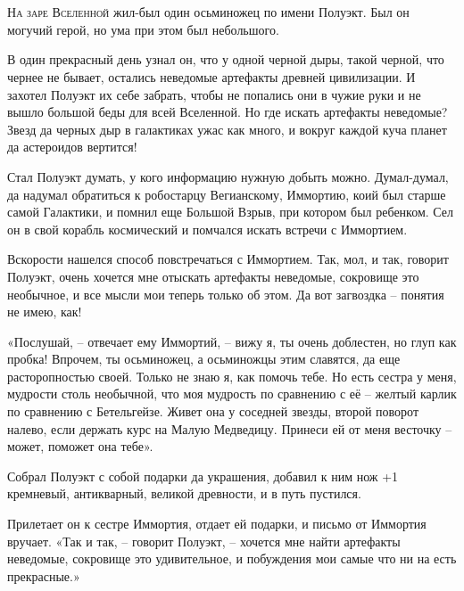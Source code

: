 \documentclass[ebook,oneside,final,openright]{memoir}
\begin{document}
\chapter{}
 \lettrine{Н}{а заре Вселенной} жил-был один осьминожец по имени Полуэкт. Был он могучий герой, но ума при этом был небольшого.\par
\par
В один прекрасный день узнал он, что у одной черной дыры, такой черной, что чернее не бывает, остались неведомые артефакты древней цивилизации. И захотел Полуэкт их себе забрать, чтобы не попались они в чужие руки и не вышло большой беды для всей Вселенной. Но где искать артефакты неведомые? Звезд да черных дыр в галактиках ужас как много, и вокруг каждой куча планет да астероидов вертится!\par
\par
Стал Полуэкт думать, у кого информацию нужную добыть можно. Думал-думал, да надумал обратиться к робостарцу Вегианскому, Иммортию, коий был старше самой Галактики, и помнил еще Большой Взрыв, при котором был ребенком. Сел он в свой корабль космический и помчался искать встречи с Иммортием.\par
\par
Вскорости нашелся способ повстречаться с Иммортием. Так, мол, и так, говорит Полуэкт, очень хочется мне отыскать артефакты неведомые, сокровище это необычное, и все мысли мои теперь только об этом. Да вот загвоздка – понятия не имею, как!\par
\par
«Послушай, – отвечает ему Иммортий, – вижу я, ты очень доблестен, но глуп как пробка! Впрочем, ты осьминожец, а осьминожцы этим славятся, да еще расторопностью своей. Только не знаю я, как помочь тебе. Но есть сестра у меня, мудрости столь необычной, что моя мудрость по сравнению с её – желтый карлик по сравнению с Бетельгейзе. Живет она у соседней звезды, второй поворот налево, если держать курс на Малую Медведицу. Принеси ей от меня весточку – может, поможет она тебе».\par
\par
Собрал Полуэкт с собой подарки да украшения, добавил к ним нож +1 кремневый, антикварный, великой древности, и в путь пустился.\par
\par
Прилетает он к сестре Иммортия, отдает ей подарки, и письмо от Иммортия вручает. «Так и так, – говорит Полуэкт, – хочется мне найти артефакты неведомые, сокровище это удивительное, и побуждения мои самые что ни на есть прекрасные.»\par
\end{document}

